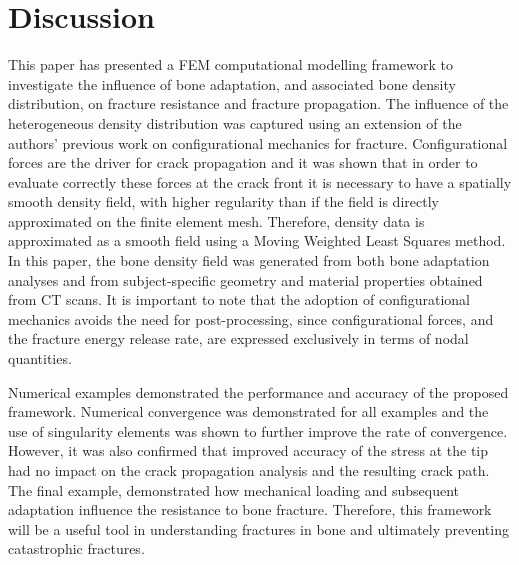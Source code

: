 \documentclass[onecolumn]{svjour3}
\begin{document}
\section{Discussion}\label{sec:discussion}
This paper has presented a FEM computational modelling framework to investigate the influence of bone adaptation, and associated bone density distribution, on fracture resistance and fracture propagation. 
The influence of the heterogeneous density distribution was captured using an extension of the authors' previous work on configurational mechanics for fracture. 
Configurational forces are the driver for crack propagation and it was shown that in order to evaluate correctly these forces at the crack front it is necessary to have a spatially smooth density field, with higher regularity than if the field is directly approximated on the finite element mesh. 
Therefore, density data is approximated as a smooth field using a Moving Weighted Least Squares method. 
In this paper, the bone density field was generated from both bone adaptation analyses and from subject-specific geometry and material properties obtained from CT scans. 
It is important to note that the adoption of configurational mechanics avoids the need for post-processing, since configurational forces, and the fracture energy release rate, are expressed exclusively in terms of nodal quantities.


Numerical examples demonstrated the performance and accuracy of the proposed framework. 
Numerical convergence was demonstrated for all examples and the use of singularity elements was shown to further improve the rate of convergence. However, it was also confirmed that improved accuracy of the stress at the tip had no impact on the crack propagation analysis and the resulting crack path.  The final example, demonstrated how mechanical loading and subsequent adaptation influence the resistance to bone fracture. Therefore, this framework will be a useful tool in understanding fractures in bone and ultimately preventing catastrophic fractures. 
\end{document}

